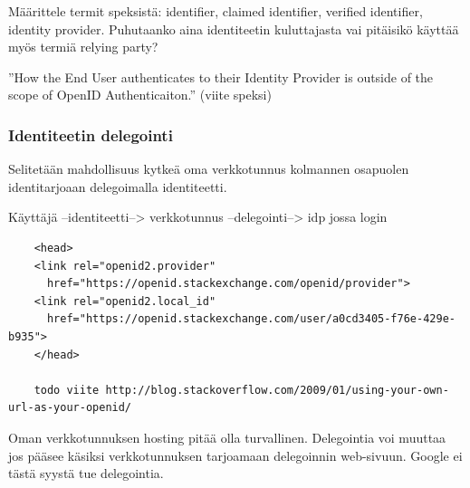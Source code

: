 \documentclass[finnish,gradu]{tktltiki}
\begin{document}
  Määrittele termit speksistä: identifier, claimed identifier, verified identifier, identity provider.
  Puhutaanko aina identiteetin kuluttajasta vai pitäisikö käyttää myös termiä relying party?

  ''How the End User authenticates to their Identity Provider is outside of the scope of OpenID Authenticaiton.'' (viite speksi)




  \subsubsection{Identiteetin delegointi} %
  \label{ssub:identiteetin_delegointi}

  Selitetään mahdollisuus kytkeä oma verkkotunnus kolmannen osapuolen identitarjoaan delegoimalla identiteetti.

  Käyttäjä --identiteetti--> verkkotunnus --delegointi--> idp jossa login

  \begin{verbatim}
    <head>
    <link rel="openid2.provider"
      href="https://openid.stackexchange.com/openid/provider">
    <link rel="openid2.local_id"
      href="https://openid.stackexchange.com/user/a0cd3405-f76e-429e-b935">
    </head>

    todo viite http://blog.stackoverflow.com/2009/01/using-your-own-url-as-your-openid/
  \end{verbatim}

  Oman verkkotunnuksen hosting pitää olla turvallinen. Delegointia voi muuttaa jos pääsee käsiksi verkkotunnuksen tarjoamaan delegoinnin web-sivuun.
  Google ei tästä syystä tue delegointia.



\end{document}
